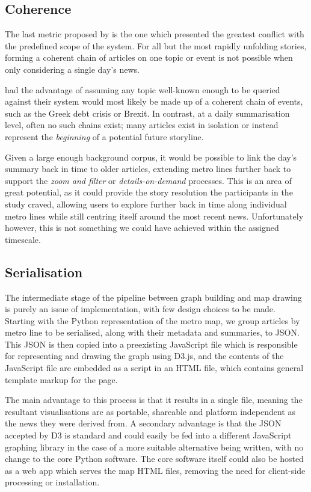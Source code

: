 \subsection{Coherence}
The last metric proposed by \citeauthor{GeneratingInformationMaps} is the one which presented the greatest conflict with the predefined scope of the system. For all but the most rapidly unfolding stories, forming a coherent chain of articles on one topic or event is not possible when only considering a single day's news. 

\citeauthor{GeneratingInformationMaps} had the advantage of assuming any topic well-known enough to be queried against their system would most likely be made up of a coherent chain of events, such as the Greek debt crisis or Brexit. In contrast, at a daily summarisation level, often no such chains exist; many articles exist in isolation or instead represent the \textit{beginning} of a potential future storyline. 

Given a large enough background corpus, it would be possible to link the day's summary back in time to older articles, extending metro lines further back to support the \textit{zoom and filter} or \textit{details-on-demand} processes. This is an area of great potential, as it could provide the story resolution the participants in the \cite{anewmodelfornews} study craved, allowing users to explore further back in time along individual metro lines while still centring itself around the most recent news. Unfortunately however, this is not something we could have achieved within the assigned timescale. 


\subsection{Serialisation}
The intermediate stage of the pipeline between graph building and map drawing is purely an issue of implementation, with few design choices to be made. Starting with the Python representation of the metro map, we group articles by metro line to be serialised, along with their metadata and summaries, to JSON. This JSON is then copied into a preexisting JavaScript file which is responsible for representing and drawing the graph using D3.js, and the contents of the JavaScript file are embedded as a script in an HTML file, which contains general template markup for the page. 

The main advantage to this process is that it results in a single file, meaning the resultant visualisations are as portable, shareable and platform independent as the news they were derived from. A secondary advantage is that the JSON accepted by D3 is standard and could easily be fed into a different JavaScript graphing library in the case of a more suitable alternative being written, with no change to the core Python software. The core software itself could also be hosted as a web app which serves the map HTML files, removing the need for client-side processing or installation.

